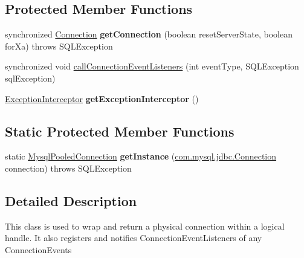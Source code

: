 \subsection*{Protected Member Functions}
\begin{DoxyCompactItemize}
\item 
\mbox{\label{classcom_1_1mysql_1_1jdbc_1_1jdbc2_1_1optional_1_1_mysql_pooled_connection_af276edd30e58faf232ccd57112a42a33}} 
synchronized \mbox{\hyperlink{interfacecom_1_1mysql_1_1jdbc_1_1_connection}{Connection}} {\bfseries get\+Connection} (boolean reset\+Server\+State, boolean for\+Xa)  throws S\+Q\+L\+Exception 
\item 
synchronized void \mbox{\hyperlink{classcom_1_1mysql_1_1jdbc_1_1jdbc2_1_1optional_1_1_mysql_pooled_connection_aeef444cea48fb46a831d6f7f6b7a6bf9}{call\+Connection\+Event\+Listeners}} (int event\+Type, S\+Q\+L\+Exception sql\+Exception)
\item 
\mbox{\label{classcom_1_1mysql_1_1jdbc_1_1jdbc2_1_1optional_1_1_mysql_pooled_connection_aa0acc78a41ee2381c510413fd14c97e5}} 
\mbox{\hyperlink{interfacecom_1_1mysql_1_1jdbc_1_1_exception_interceptor}{Exception\+Interceptor}} {\bfseries get\+Exception\+Interceptor} ()
\end{DoxyCompactItemize}
\subsection*{Static Protected Member Functions}
\begin{DoxyCompactItemize}
\item 
\mbox{\label{classcom_1_1mysql_1_1jdbc_1_1jdbc2_1_1optional_1_1_mysql_pooled_connection_ad8aeacc51d58a65cd18742c6b2da8489}} 
static \mbox{\hyperlink{classcom_1_1mysql_1_1jdbc_1_1jdbc2_1_1optional_1_1_mysql_pooled_connection}{Mysql\+Pooled\+Connection}} {\bfseries get\+Instance} (\mbox{\hyperlink{interfacecom_1_1mysql_1_1jdbc_1_1_connection}{com.\+mysql.\+jdbc.\+Connection}} connection)  throws S\+Q\+L\+Exception 
\end{DoxyCompactItemize}


\subsection{Detailed Description}
This class is used to wrap and return a physical connection within a logical handle. It also registers and notifies Connection\+Event\+Listeners of any Connection\+Events 

